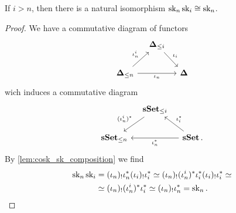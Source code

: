 \begin{lemma}\label{lem:sk-comp}
  If \(i > n\), then there is a natural isomorphism
  \(\operatorname{\textnormal{sk}}_n\operatorname{\textnormal{sk}}_i\cong \operatorname{\textnormal{sk}}_n\).
\end{lemma}
\begin{proof}
We have a commutative diagram of functors
\[
  \begin{tikzcd}[column sep=1em]
    {} & \simplex_{\leq i} \arrow[rd, "\iota_i"] & {} \\
    \simplex_{\leq n} \arrow[ru, "\iota_n^i"] \arrow[rr, "\iota_n"'] & & \simplex
  \end{tikzcd}
\]
wich induces a commutative diagram
\[
  \begin{tikzcd}[column sep=1em]
    {} & \sset_{\leq i} \arrow[dl, "(\iota_n^i)^{*}"'] & {} \\
    \sset_{\leq n} & & \sset \arrow[ul, "\iota_i^{*}"'] \arrow[ll, "\iota_n^{*}"].
  \end{tikzcd}
\]
By \autoref{lem:cosk_sk_composition} we find
\begin{align*}
  \operatorname{\textnormal{sk}}_n\operatorname{\textnormal{sk}}_i &= (\iota_n)_{!}\iota_n^{*}(\iota_i)_{!}\iota_i^{*} \simeq
               (\iota_n)_{!}(\iota_n^i)^{*}\iota_i^{*}(\iota_i)_{!}\iota_i^{*} \simeq
  \\
             &\simeq (\iota_n)_{!}(\iota_{n}^i)^{*}\iota_i^{*}\simeq (\iota_n)_{!}\iota_n^{*} = \operatorname{\textnormal{sk}}_{n}.\qedhere
\end{align*}
\end{proof}

